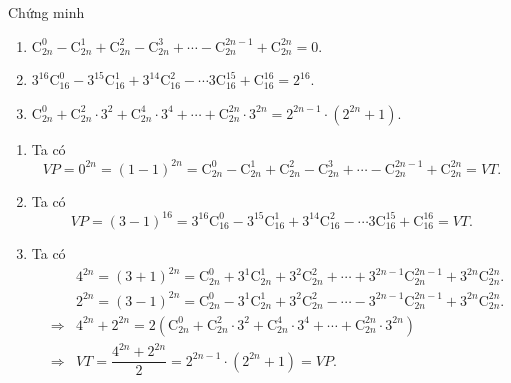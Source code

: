 \begin{bt}%
Chứng minh
\begin{enumerate}
\item $\mathrm{C}_{2n}^0 - \mathrm{C}_{2n}^1 + \mathrm{C}_{2n}^2 - \mathrm{C}_{2n}^3 + \cdots - \mathrm{C}_{2n}^{2n-1} + \mathrm{C}_{2n}^{2n}=0$.
\item $3^{16}\mathrm{C}_{16}^0 - 3^{15}\mathrm{C}_{16}^1 + 3^{14}\mathrm{C}_{16}^2 -  \cdots 3\mathrm{C}_{16}^{15} + \mathrm{C}_{16}^{16}=2^{16}$.
\item $\mathrm{C}_{2n}^0 + \mathrm{C}_{2n}^2\cdot3^2 + \mathrm{C}_{2n}^4\cdot3^4 + \cdots + \mathrm{C}_{2n}^{2n}\cdot3^{2n}=2^{2n-1}\cdot(2^{2n}+1)$.
\end{enumerate}
\loigiai
{
\begin{enumerate}
\item Ta có $$
VP=0^{2n}=(1-1)^{2n}=\mathrm{C}_{2n}^0 - \mathrm{C}_{2n}^1 + \mathrm{C}_{2n}^2 - \mathrm{C}_{2n}^3 + \cdots - \mathrm{C}_{2n}^{2n-1} + \mathrm{C}_{2n}^{2n}=VT.$$
\item Ta có
$$VP=(3-1)^{16}=3^{16}\mathrm{C}_{16}^0 - 3^{15}\mathrm{C}_{16}^1 + 3^{14}\mathrm{C}_{16}^2 -  \cdots 3\mathrm{C}_{16}^{15} + \mathrm{C}_{16}^{16}=VT.$$
\item Ta có
\begin{eqnarray*}
&&4^{2n}=(3+1)^{2n}=\mathrm{C}_{2n}^0+3^1\mathrm{C}_{2n}^1+3^2\mathrm{C}_{2n}^2+\cdots +3^{2n-1}\mathrm{C}_{2n}^{2n-1}+3^{2n}\mathrm{C}_{2n}^{2n}.\\
&&2^{2n}=(3-1)^{2n}=\mathrm{C}_{2n}^0-3^1\mathrm{C}_{2n}^1+3^2\mathrm{C}_{2n}^2-\cdots -3^{2n-1}\mathrm{C}_{2n}^{2n-1}+3^{2n}\mathrm{C}_{2n}^{2n}.\\
&\Rightarrow &4^{2n}+2^{2n}=2\left ( \mathrm{C}_{2n}^0 + \mathrm{C}_{2n}^2\cdot3^2 + \mathrm{C}_{2n}^4\cdot3^4 + \cdots + \mathrm{C}_{2n}^{2n}\cdot3^{2n}\right )\\&\Rightarrow &VT=\dfrac{4^{2n}+2^{2n}}{2}=2^{2n-1}\cdot\left (2^{2n}+1 \right )=VP.
\end{eqnarray*}
\end{enumerate}
}
\end{bt}

